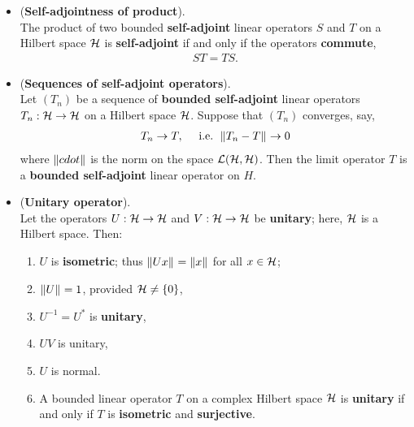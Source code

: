 \documentclass[11pt]{article}
\begin{document}
\begin{itemize}
\item \begin{proposition}(\textbf{Self-adjointness of product}).  \citep{kreyszig1989introductory} \\
The product of two bounded \textbf{self-adjoint} linear operators $S$ and $T$ on a Hilbert space ${\mathcal H}$ is \textbf{self-adjoint} if and only if the operators \textbf{commute},
\begin{align*}
ST=TS.
\end{align*}
\end{proposition}

\item \begin{proposition} (\textbf{Sequences of self-adjoint operators}). \citep{kreyszig1989introductory}\\
 Let $(T_n)$ be a sequence of \textbf{bounded self-adjoint} linear operators $T_n: {\mathcal H} \rightarrow {\mathcal H}$ on a Hilbert space ${\mathcal H}$. Suppose that $(T_n)$ converges, say,
 \begin{align*}
 T_n \rightarrow T, \quad \text{ i.e. } \left\|T_n - T\right\|_{} \rightarrow 0
 \end{align*}
where $\left\|\\cdot\right\|_{}$ is the norm on the space ${\mathcal L}({\mathcal H}, {\mathcal H})$. Then the limit operator $T$ is a \textbf{bounded self-adjoint} linear operator on $H$.
\end{proposition}

\item \begin{proposition} (\textbf{Unitary operator}). \citep{kreyszig1989introductory}\\
Let the operators $U: {\mathcal H} \rightarrow {\mathcal H}$ and $V: {\mathcal H} \rightarrow {\mathcal H}$ be \textbf{unitary}; here, ${\mathcal H}$ is a Hilbert space. Then:
\begin{enumerate}
\item $U$ is \textbf{isometric}; thus $\left\|Ux\right\|_{} = \left\|x\right\|_{}$ for all $x \in {\mathcal H}$;
\item $\left\|U\right\|_{}= 1$, provided ${\mathcal H} \neq \{0\}$,
\item $U^{-1}= U^{*}$ is \textbf{unitary},
\item $UV$ is unitary,
\item $U$ is normal.
\item A bounded linear operator $T$ on a complex Hilbert space ${\mathcal H}$ is \textbf{unitary} if and only if $T$ is \textbf{isometric} and \textbf{surjective}.
\end{enumerate}
\end{proposition}
\end{itemize}
\end{document}

